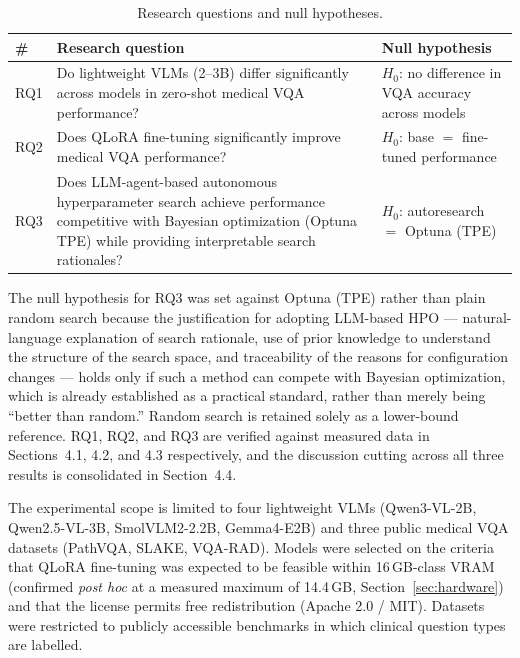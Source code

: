 \begin{table}[t]
\centering
\caption{Research questions and null hypotheses.}
\label{tab:rqs}
\small
\begin{tabular}{@{}p{}p{}p{}@{}}
\toprule
\# & Research question & Null hypothesis \\
\midrule
RQ1 & Do lightweight VLMs (2--3B) differ significantly across models in
zero-shot medical VQA performance? & $H_0$: no difference in VQA accuracy across
models \\
RQ2 & Does QLoRA fine-tuning significantly improve medical VQA performance? &
$H_0$: base $=$ fine-tuned performance \\
RQ3 & Does LLM-agent-based autonomous hyperparameter search achieve performance
competitive with Bayesian optimization (Optuna TPE) while providing interpretable
search rationales? & $H_0$: autoresearch $=$ Optuna (TPE) \\
\bottomrule
\end{tabular}
\end{table}

The null hypothesis for RQ3 was set against Optuna (TPE) rather than plain random
search because the justification for adopting LLM-based HPO --- natural-language
explanation of search rationale, use of prior knowledge to understand the
structure of the search space, and traceability of the reasons for configuration
changes --- holds only if such a method can compete with Bayesian optimization,
which is already established as a practical standard, rather than merely being
``better than random.'' Random search is retained solely as a lower-bound
reference. RQ1, RQ2, and RQ3 are verified against measured data in
Sections~4.1, 4.2, and 4.3 respectively, and the discussion cutting across all
three results is consolidated in Section~4.4.

The experimental scope is limited to four lightweight VLMs (Qwen3-VL-2B,
Qwen2.5-VL-3B, SmolVLM2-2.2B, Gemma4-E2B) and three public medical VQA datasets
(PathVQA, SLAKE, VQA-RAD). Models were selected on the criteria that QLoRA
fine-tuning was expected to be feasible within 16\,GB-class VRAM (confirmed
\emph{post hoc} at a measured maximum of 14.4\,GB, Section~\ref{sec:hardware})
and that the license permits free redistribution (Apache 2.0 / MIT). Datasets
were restricted to publicly accessible benchmarks in which clinical question
types are labelled.

